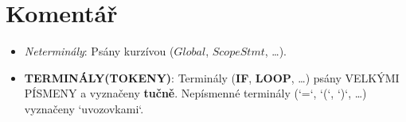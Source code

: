 \documentclass[a4paper,11pt,landscape,leqno]{article}
\begin{document}
\section{Komentář}
\begin{itemize}
\item{\emph{Neterminály}: Psány kurzívou ($Global$, $ScopeStmt$, \dots).}
\item{\textbf{TERMINÁLY(TOKENY)}: Terminály (\textbf{IF}, \textbf{LOOP}, \dots) psány VELKÝMI PÍSMENY a vyznačeny \textbf{tučně}. Nepísmenné terminály (`=`, `(`, `)`, \dots) vyznačeny `uvozovkami`.}
\end{itemize}
\enddocument
\end{document}
